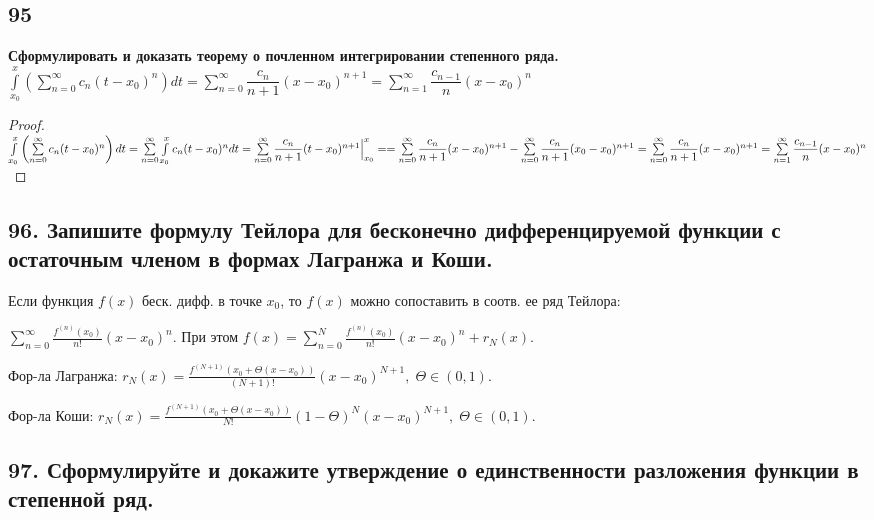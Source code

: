 \documentclass[a4paper, fleqn]{article}
\begin{document}
    \subsection*{95}
    \textbf{ Сформулировать и доказать теорему о почленном интегрировании степенного ряда.} \\[5 pt]
    $\int\limits_{x_0}^x \left( \sum\limits_{n = 0}^{\infty} c_n(t - x_0)^n \right) dt = 
    \sum\limits_{n = 0}^{\infty} \dfrac{c_n}{n + 1}(x - x_0)^{n + 1} = 
    \sum\limits_{n = 1}^{\infty} \dfrac{c_{n - 1}}n (x - x_0)^n$
    \begin{proof}
    $\int\limits_{x_0}^x \left( \sum\limits_{n = 0}^{\infty} c_n(t - x_0)^n \right) dt = 
    \sum\limits_{n = 0}^{\infty} \int\limits_{x_0}^x c_n(t - x_0)^n dt = 
    \sum\limits_{n = 0}^{\infty} \dfrac{c_n}{n + 1}(t - x_0)^{n + 1}\Big|_{x_0}^x = \\[3 pt]
    = \sum\limits_{n = 0}^{\infty} \dfrac{c_n}{n + 1}(x - x_0)^{n + 1} - 
    \sum\limits_{n = 0}^{\infty} \dfrac{c_n}{n + 1}(x_0 - x_0)^{n + 1} = 
    \sum\limits_{n = 0}^{\infty} \dfrac{c_n}{n + 1}(x - x_0)^{n + 1} = \sum\limits_{n = 1}^{\infty} \dfrac{c_{n - 1}}n (x - x_0)^n$
    \end{proof}    
    
    \subsection*{96. Запишите формулу Тейлора для бесконечно дифференцируемой функции с остаточным членом в формах Лагранжа и Коши.}
    
    Если функция $f(x)$ беск. дифф. в точке $x_0$, то $f(x)$ можно сопоставить в соотв. ее ряд Тейлора:
    
    $\displaystyle \sum_{n = 0}^{\infty} \frac{f^{(n)} (x_0)}{n!} (x - x_0)^n.$ При этом $f(x) = \displaystyle \sum_{n = 0}^{N} \frac{f^{(n)} (x_0)}{n!} (x - x_0)^n + r_N (x).$
    
    Фор-ла Лагранжа: $r_N(x) = \frac{ f^{(N + 1)} (x_0 + \Theta(x - x_0))}{(N + 1)!} (x - x_0)^{N + 1}, \; \Theta \in (0, 1). $
    
    Фор-ла Коши: $r_N(x) = \frac{f^{(N + 1)} (x_0 + \Theta(x - x_0))}{N!} (1 - \Theta)^N (x - x_0)^{N + 1}, \; \Theta \in (0, 1).$
        
        
    
    \subsection*{97. Сформулируйте и докажите утверждение о единственности разложения функции в степенной ряд.}
    
\end{document}
